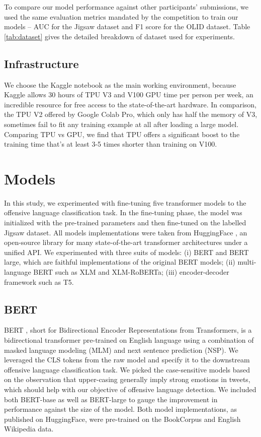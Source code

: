 \documentclass[11pt,a4paper]{article}
\begin{document}
To compare our model performance against other participants’ submissions, we used the same evaluation metrics mandated by the competition to train our models -- AUC for the Jigsaw dataset and F1 score for the OLID dataset. Table \ref{tab:dataset} gives the detailed breakdown of dataset used for experiments.

\subsection{Infrastructure}
We choose the Kaggle notebook as the main working environment, because Kaggle allows 30 hours of TPU V3 and V100 GPU time per person per week, an incredible resource for free access to the state-of-the-art hardware. In comparison, the TPU V2 offered by Google Colab Pro, which only has half the memory of V3, sometimes fail to fit any training example at all after loading a large model. Comparing TPU vs GPU, we find that TPU offers a significant boost to the training time that’s at least 3-5 times shorter than training on V100.

\section{Models}
In this study, we experimented with fine-tuning five transformer models to the offensive language classification task. In the fine-tuning phase, the model was initialized with the pre-trained parameters and then fine-tuned on the labelled Jigsaw dataset. All models implementations were taken from HuggingFace \citep{wolf2019huggingfaces}, an open-source library for many state-of-the-art transformer architectures under a unified API. We experimented with three suits of models: (i) BERT and BERT large, which are faithful implementations of the original BERT models; (ii) multi-language BERT such as XLM and XLM-RoBERTa; (iii) encoder-decoder framework such as T5. 

\subsection{BERT}
BERT \citep{DBLP:journals/corr/abs-1810-04805}, short for Bidirectional Encoder Representations from Transformers, is a bidirectional transformer pre-trained on English language using a combination of masked language modeling (MLM) and next sentence prediction (NSP). We leveraged the CLS tokens from the raw model and specify it to the downstream offensive language classification task. We picked the case-sensitive models based on the observation that upper-casing generally imply strong emotions in tweets, which should help with our objective of offensive language detection. We included both BERT-base as well as BERT-large to gauge the improvement in performance against the size of the model. Both model implementations, as published on HuggingFace, were pre-trained on the BookCorpus and English Wikipedia data.
\end{document}
